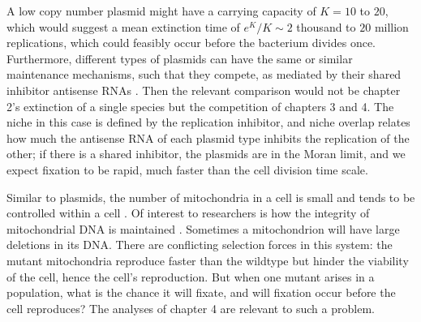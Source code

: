 A low copy number plasmid might have a carrying capacity of $K=10$ to $20$, which would suggest a mean extinction time of $e^K/K\sim 2$ thousand to $20$ million replications, which could feasibly occur before the bacterium divides once. 
Furthermore, different types of plasmids can have the same or similar maintenance mechanisms, such that they compete, as mediated by their shared inhibitor antisense RNAs \cite{DelSolar1998}. 
Then the relevant comparison would not be chapter 2's extinction of a single species but the competition of chapters 3 and 4. 
The niche in this case is defined by the replication inhibitor, and niche overlap relates how much the antisense RNA of each plasmid type inhibits the replication of the other; if there is a shared inhibitor, the plasmids are in the Moran limit, and we expect fixation to be rapid, much faster than the cell division time scale. 

Similar to plasmids, the number of mitochondria in a cell is small and tends to be controlled within a cell \cite{Michaels1982,Shuster1988,Taanman1999}. 
Of interest to researchers is how the integrity of mitochondrial DNA is maintained \cite{Taanman1999}. 
Sometimes a mitochondrion will have large deletions in its DNA. 
There are conflicting selection forces in this system: the mutant mitochondria reproduce faster than the wildtype but hinder the viability of the cell, hence the cell's reproduction. 
But when one mutant arises in a population, what is the chance it will fixate, and will fixation occur before the cell reproduces? 
The analyses of chapter 4 are relevant to such a problem. 

